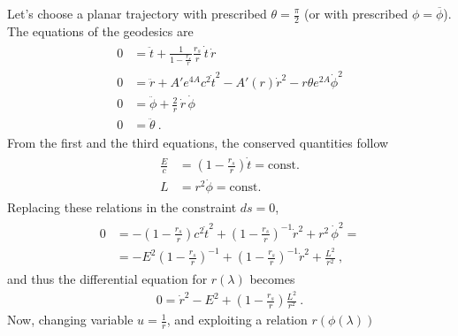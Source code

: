 \documentclass[letterpaper,10pt,english]{jupyterBook}
\begin{document}
\sphinxAtStartPar
Let’s choose a planar trajectory with prescribed \(\theta=\frac{\pi}{2}\) (or with prescribed \(\phi = \overline{\phi}\)). The equations of the geodesics are
\begin{equation*}
\begin{split}\begin{aligned}
  0 & = \ddot{t} + \frac{1}{1 - \frac{r_s}{r}}\frac{r_s}{r} \, \dot{t} \, \dot{r} \\
  0 & = \ddot{r} + A' e^{4 A} c^2 \dot{t}^2 - A'(r) \dot{r}^2 - r \theta e^{2 A} \dot{\phi}^2 \\ 
  0 & = \ddot{\phi} + \frac{2}{r} \, \dot{r} \, \dot{\phi} \\
  0 & = \ddot{\theta} \ .
\end{aligned}\end{split}
\end{equation*}
\sphinxAtStartPar
From the first and the third equations, the conserved quantities follow
\begin{equation*}
\begin{split}\begin{aligned}
  \frac{E}{c} & = \left( 1 - \frac{r_s}{r} \right) \dot{t} = \text{const.} \\
  L & = r^2 \dot{\phi} = \text{const.}
\end{aligned}\end{split}
\end{equation*}
\sphinxAtStartPar
Replacing these relations in the constraint \(ds = 0\),
\begin{equation*}
\begin{split}\begin{aligned}
0
 & = - \left(1 - \frac{r_s}{r} \right) c^2 \dot{t}^2 + \left(1 - \frac{r_s}{r} \right)^{-1} \dot{r}^2 + r^2 \, \dot{\phi}^2 = \\
 & = - E^2 \left(1 - \frac{r_s}{r} \right)^{-1} + \left(1 - \frac{r_s}{r} \right)^{-1} \dot{r}^2 + \frac{L^2}{r^2} \ ,
\end{aligned}\end{split}
\end{equation*}
\sphinxAtStartPar
and thus the differential equation for \(r(\lambda)\) becomes
\begin{equation*}
\begin{split}0 = \dot{r}^2 - E^2 + \left( 1 - \frac{r_s}{r} \right) \frac{L^2}{r^2} \ .\end{split}
\end{equation*}
\sphinxAtStartPar
Now, changing variable \(u = \frac{1}{r}\), and exploiting a relation \(r(\phi(\lambda))\)
\end{document}
